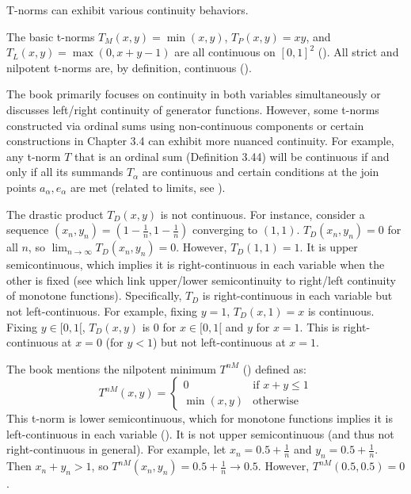 T-norms can exhibit various continuity behaviors.

\begin{example}
  The basic t-norms $T_M(x,y) = \min(x,y)$, $T_P(x,y) = xy$, and $T_L(x,y) = \max(0, x+y-1)$ are all continuous on $[0,1]^2$ (\cite[p.~15]{Klement2000}). All strict and nilpotent t-norms are, by definition, continuous (\cite[Definition 2.13, p.~42]{Klement2000}).
\end{example}

\begin{remark}
  The book primarily focuses on continuity in both variables simultaneously or discusses left/right continuity of generator functions. However, some t-norms constructed via ordinal sums using non-continuous components or certain constructions in Chapter 3.4 can exhibit more nuanced continuity.
  For example, any t-norm $T$ that is an ordinal sum (Definition 3.44) will be continuous if and only if all its summands $T_\alpha$ are continuous and certain conditions at the join points $a_\alpha, e_\alpha$ are met (related to limits, see \cite[Proposition 3.49, p.~100]{Klement2000}).
\end{remark}

\begin{example}
  The drastic product $T_D(x,y)$ is not continuous. For instance, consider a sequence $(x_n, y_n) = (1-\frac{1}{n}, 1-\frac{1}{n})$ converging to $(1,1)$.
  $T_D(x_n, y_n) = 0$ for all $n$, so $\lim_{n\to\infty} T_D(x_n, y_n) = 0$.
  However, $T_D(1,1) = 1$.
  It is upper semicontinuous, which implies it is right-continuous in each variable when the other is fixed (see \cite[Remark 1.21, Proposition 1.22]{Klement2000} which link upper/lower semicontinuity to right/left continuity of monotone functions).
  Specifically, $T_D$ is right-continuous in each variable but not left-continuous. For example, fixing $y=1$, $T_D(x,1)=x$ is continuous. Fixing $y \in [0,1[$, $T_D(x,y)$ is $0$ for $x \in [0,1[$ and $y$ for $x=1$. This is right-continuous at $x=0$ (for $y<1$) but not left-continuous at $x=1$.
\end{example}

\begin{example}
  The book mentions the nilpotent minimum $T^{nM}$ (\cite[Remark 1.21, p.~16 and Fig 1.5, p.~17]{Klement2000}) defined as:
  \[
  T^{nM}(x,y) =
  \begin{cases}
    0 & \text{if } x+y \leq 1 \\
    \min(x,y) & \text{otherwise}
  \end{cases}
  \]
  This t-norm is lower semicontinuous, which for monotone functions implies it is left-continuous in each variable (\cite[Proposition 1.22, p.~17]{Klement2000}). It is not upper semicontinuous (and thus not right-continuous in general). For example, let $x_n = 0.5 + \frac{1}{n}$ and $y_n = 0.5 + \frac{1}{n}$. Then $x_n+y_n > 1$, so $T^{nM}(x_n, y_n) = 0.5 + \frac{1}{n} \to 0.5$. However, $T^{nM}(0.5, 0.5) = 0$.
\end{example}

